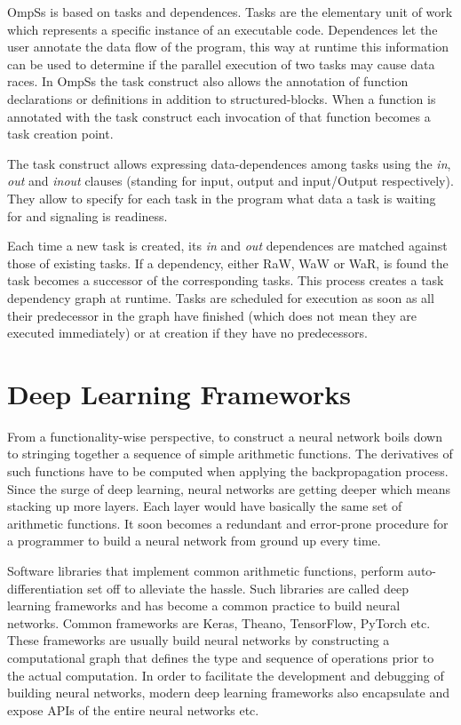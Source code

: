 OmpSs is based on tasks and dependences. Tasks are the elementary unit of work 
which represents a specific instance of an executable code. Dependences let the 
user annotate the data flow of the program, this way at runtime this information 
can be used to determine if the parallel execution of two tasks may cause data races.
In OmpSs the task construct also allows the annotation of function declarations or 
definitions in addition to structured-blocks. When a function is annotated with the 
task construct each invocation of that function becomes a task creation point.

The task construct allows expressing data-dependences among tasks using the 
\textit{in}, \textit{out} and \textit{inout} clauses (standing for input, output 
and input/Output respectively). They allow to specify for each task in the program 
what data a task is waiting for and signaling is readiness.

Each time a new task is created, its \textit{in} and \textit{out} dependences are 
matched against those of existing tasks. If a dependency, either RaW, WaW or WaR, 
is found the task becomes a successor of the corresponding tasks. This process 
creates a task dependency graph at runtime. Tasks are scheduled for execution as 
soon as all their predecessor in the graph have finished (which does not mean they 
are executed immediately) or at creation if they have no predecessors.

\section{Deep Learning Frameworks}
From a functionality-wise perspective, to construct a neural network boils down 
to stringing together a sequence of simple arithmetic functions. The derivatives
of such functions have to be computed when applying the backpropagation process.
Since the surge of deep learning, neural networks are getting deeper which means 
stacking up more layers. Each layer would have basically the same set of 
arithmetic functions. It soon becomes a redundant and error-prone procedure for 
a programmer to build a neural network from ground up every time. 

Software libraries that implement common arithmetic functions, perform auto-differentiation 
set off to alleviate the hassle. Such libraries are called deep learning frameworks 
and has become a common practice to build neural networks. Common frameworks are 
Keras, Theano, TensorFlow, PyTorch etc. These frameworks are usually build 
neural networks by constructing a computational graph that defines the type and 
sequence of operations prior to the actual computation.
In order to facilitate the development and debugging of building neural networks,
modern deep learning frameworks also encapsulate and expose APIs of the entire 
neural networks etc.

